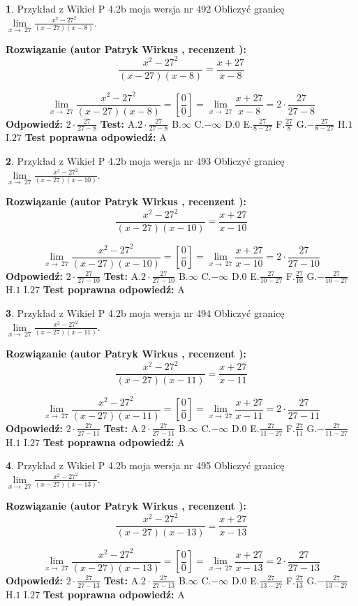 \documentclass[12pt, a4paper]{article}
\theoremstyle{definition} %
\newtheorem{zad}{}
\newcommand{\zadStart}[1]{\begin{zad}#1\newline}
\newcommand{\zadStop}{\end{zad}}
\newcommand{\rozwStart}[2]{\noindent \textbf{Rozwiązanie (autor #1 , recenzent #2): }\newline}
\newcommand{\rozwStop}{\newline}
\newcommand{\odpStart}{\noindent \textbf{Odpowiedź:}\newline}
\newcommand{\odpStop}{\newline}
\newcommand{\testStart}{\noindent \textbf{Test:}\newline}
\newcommand{\testStop}{\newline}
\newcommand{\kluczStart}{\noindent \textbf{Test poprawna odpowiedź:}\newline}
\newcommand{\kluczStop}{\newline}
\begin{document}
\zadStart{Przykład z Wikieł P 4.2b moja wersja nr 492}
Obliczyć granicę $\lim\limits_{x\to\ 27}\frac{x^{2}-27^{2}}{(x-27)(x-8)}$.
\zadStop
\rozwStart{Patryk Wirkus}{}
$$\frac{x^{2}-27^{2}}{(x-27)(x-8)}=\frac{x+27}{x-8}$$

$$\lim\limits_{x\to\ 27}\frac{x^{2}-27^{2}}{(x-27)(x-8)}=[\frac{0}{0}]=\lim\limits_{x\to\ 27}\frac{x+27}{x-8}=2 \cdot \frac{27}{27-8}$$
\rozwStop
\odpStart
$2 \cdot \frac{27}{27-8}$
\odpStop
\testStart
A.$2 \cdot \frac{27}{27-8}$
B.$\infty$
C.$-\infty$
D.$0$
E.$\frac{27}{8-27}$
F.$\frac{27}{8}$
G.$-\frac{27}{8-27}$
H.$1$
I.$27$
\testStop
\kluczStart
A
\kluczStop



\zadStart{Przykład z Wikieł P 4.2b moja wersja nr 493}
Obliczyć granicę $\lim\limits_{x\to\ 27}\frac{x^{2}-27^{2}}{(x-27)(x-10)}$.
\zadStop
\rozwStart{Patryk Wirkus}{}
$$\frac{x^{2}-27^{2}}{(x-27)(x-10)}=\frac{x+27}{x-10}$$

$$\lim\limits_{x\to\ 27}\frac{x^{2}-27^{2}}{(x-27)(x-10)}=[\frac{0}{0}]=\lim\limits_{x\to\ 27}\frac{x+27}{x-10}=2 \cdot \frac{27}{27-10}$$
\rozwStop
\odpStart
$2 \cdot \frac{27}{27-10}$
\odpStop
\testStart
A.$2 \cdot \frac{27}{27-10}$
B.$\infty$
C.$-\infty$
D.$0$
E.$\frac{27}{10-27}$
F.$\frac{27}{10}$
G.$-\frac{27}{10-27}$
H.$1$
I.$27$
\testStop
\kluczStart
A
\kluczStop



\zadStart{Przykład z Wikieł P 4.2b moja wersja nr 494}
Obliczyć granicę $\lim\limits_{x\to\ 27}\frac{x^{2}-27^{2}}{(x-27)(x-11)}$.
\zadStop
\rozwStart{Patryk Wirkus}{}
$$\frac{x^{2}-27^{2}}{(x-27)(x-11)}=\frac{x+27}{x-11}$$

$$\lim\limits_{x\to\ 27}\frac{x^{2}-27^{2}}{(x-27)(x-11)}=[\frac{0}{0}]=\lim\limits_{x\to\ 27}\frac{x+27}{x-11}=2 \cdot \frac{27}{27-11}$$
\rozwStop
\odpStart
$2 \cdot \frac{27}{27-11}$
\odpStop
\testStart
A.$2 \cdot \frac{27}{27-11}$
B.$\infty$
C.$-\infty$
D.$0$
E.$\frac{27}{11-27}$
F.$\frac{27}{11}$
G.$-\frac{27}{11-27}$
H.$1$
I.$27$
\testStop
\kluczStart
A
\kluczStop



\zadStart{Przykład z Wikieł P 4.2b moja wersja nr 495}
Obliczyć granicę $\lim\limits_{x\to\ 27}\frac{x^{2}-27^{2}}{(x-27)(x-13)}$.
\zadStop
\rozwStart{Patryk Wirkus}{}
$$\frac{x^{2}-27^{2}}{(x-27)(x-13)}=\frac{x+27}{x-13}$$

$$\lim\limits_{x\to\ 27}\frac{x^{2}-27^{2}}{(x-27)(x-13)}=[\frac{0}{0}]=\lim\limits_{x\to\ 27}\frac{x+27}{x-13}=2 \cdot \frac{27}{27-13}$$
\rozwStop
\odpStart
$2 \cdot \frac{27}{27-13}$
\odpStop
\testStart
A.$2 \cdot \frac{27}{27-13}$
B.$\infty$
C.$-\infty$
D.$0$
E.$\frac{27}{13-27}$
F.$\frac{27}{13}$
G.$-\frac{27}{13-27}$
H.$1$
I.$27$
\testStop
\kluczStart
A
\kluczStop
\end{document}
